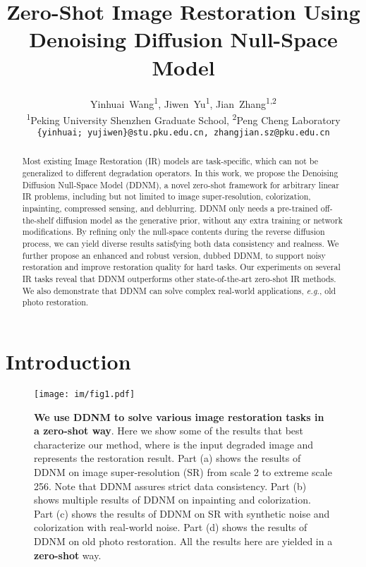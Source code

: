 \documentclass{article} \usepackage{iclr2023_conference,times}
\title{Zero-Shot Image Restoration Using\\ Denoising Diffusion Null-Space Model}
\author{Yinhuai~Wang\textsuperscript{\rm 1},
Jiwen~Yu\textsuperscript{\rm 1},
Jian~Zhang\textsuperscript{\rm 1,2}\\
\textsuperscript{\rm 1}Peking University Shenzhen Graduate School, \textsuperscript{\rm 2}Peng Cheng Laboratory\\
\texttt{\{yinhuai; yujiwen\}@stu.pku.edu.cn, zhangjian.sz@pku.edu.cn} \\
}
\begin{document}
\maketitle

\begin{abstract}
Most existing Image Restoration (IR) models are task-specific, which can not be generalized to different degradation operators. In this work, we propose the Denoising Diffusion Null-Space Model (DDNM), a novel zero-shot framework for arbitrary linear IR problems, including but not limited to image super-resolution, colorization, inpainting, compressed sensing, and deblurring. DDNM only needs a pre-trained off-the-shelf diffusion model as the generative prior, without any extra training or network modifications. By refining only the null-space contents during the reverse diffusion process, we can yield diverse results satisfying both data consistency and realness. We further propose an enhanced and robust version, dubbed DDNM, to support noisy restoration and improve restoration quality for hard tasks. Our experiments on several IR tasks reveal that DDNM outperforms other state-of-the-art zero-shot IR methods. We also demonstrate that DDNM can solve complex real-world applications, \textit{e.g.}, old photo restoration. 
\end{abstract}

\vspace{-0.1cm}
\section{Introduction}

\begin{figure*}[hb]
  \centering
  \vspace{-0.1cm}
  \texttt{[image: im/fig1.pdf]}
  \vspace{-0.7cm}
  \caption{\textbf{We use DDNM to solve various image restoration tasks in a zero-shot way}.  Here we show some of the results that best characterize our method, where  is the input degraded image and  represents the restoration result. Part (a) shows the results of DDNM on image super-resolution (SR) from scale 2 to extreme scale 256. Note that DDNM assures strict data consistency. Part (b) shows multiple results of DDNM on inpainting and colorization. Part (c) shows the results of DDNM on SR with synthetic noise and colorization with real-world noise. Part (d) shows the results of DDNM on old photo restoration. All the results here are yielded in a \textbf{zero-shot} way.}
   \vspace{-0.2cm}
\label{fig:front} 
\end{figure*}
\end{document}
